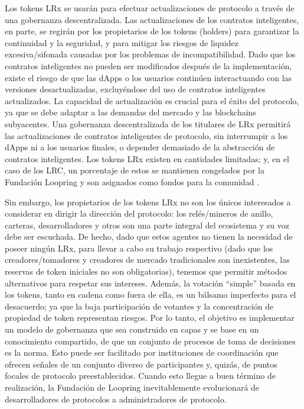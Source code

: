 \documentclass[UTF8,nofonts]{article}
\begin{document}
\begin{multicols}{2}
Los tokens LRx se usar\'an para efectuar actualizaciones de protocolo a trav\'es de una gobernanza descentralizada. Las actualizaciones de los contratos inteligentes, en parte, se regir\'an por los propietarios de los tokens (holders) para garantizar la continuidad y la seguridad, y para mitigar los riesgos de liquidez excesiva/sifonada causadas por los problemas de incompatibilidad. Dado que los contratos inteligentes no pueden ser modificados despu\'es de la implementaci\'on, existe el riesgo de que las dApps o los usuarios contin\'uen interactuando con las versiones desactualizadas, excluy\'endose del uso de contratos inteligentes actualizados. La capacidad de actualizaci\'on es crucial para el \'exito del protocolo, ya que se debe adaptar a las demandas del mercado y las blockchains subyacentes. Una gobernanza descentralizada de los titulares de LRx permitir\'a las actualizaciones de contratos inteligentes de protocolo, sin interrumpir a los dApps ni a los usuarios finales, o depender demasiado de la abstracci\'on de contratos inteligentes. Los tokens LRx existen en cantidades limitadas; y, en el caso de los LRC, un porcentaje de estos se mantienen congelados por la Fundaci\'on Loopring y son asignados como fondos para la comunidad \cite{LRCtokendoc}.

Sin embargo, los propietarios de los tokens LRx no son los \'unicos interesados a considerar en dirigir la direcci\'on del protocolo: los rel\'es/mineros de anillo, carteras, desarrolladores y otros son una parte integral del ecosistema y su voz debe ser escuchada. De hecho, dado que estos agentes no tienen la necesidad de poseer ning\'un LRx, para llevar a cabo su trabajo respectivo (dado que los creadores/tomadores y creadores de mercado tradicionales son inexistentes, las reservas de token iniciales no son obligatorias), tenemos que permitir m\'etodos alternativos para respetar sus intereses. Adem\'as, la votaci\'on \enquote{simple} basada en los tokens, tanto en cadena como fuera de ella, es un b\'alsamo imperfecto para el desacuerdo; ya que la baja participaci\'on de votantes y la concentraci\'on de propiedad de token representan riesgos. Por lo tanto, el objetivo es implementar un modelo de gobernanza que sea construido en capas y se base en un conocimiento compartido, de que un conjunto de procesos de toma de decisiones es la norma. Esto puede ser facilitado por instituciones de coordinaci\'on que ofrecen se\~nales de un conjunto diverso de participantes y, quiz\'as, de puntos focales de protocolo preestablecidos. Cuando esto llegue a buen t\'ermino de realizaci\'on, la Fundaci\'on de Loopring inevitablemente evolucionar\'a de desarrolladores de protocolos a administradores de protocolo.



\end{multicols}
\end{document}
